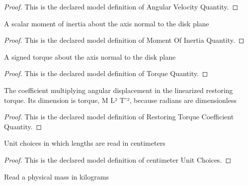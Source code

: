 \begin{proof}
  This is the declared model definition of Angular Velocity Quantity.
\end{proof}
\begin{definition}
  \label{def:physics:phyx-mini-0264:phyxminiproblems-problemphyxmini0264-momentofinertiaquantity}
  A scalar moment of inertia about the axis normal to the disk plane
\end{definition}
\begin{proof}
  This is the declared model definition of Moment Of Inertia Quantity.
\end{proof}
\begin{definition}
  \label{def:physics:phyx-mini-0264:phyxminiproblems-problemphyxmini0264-torquequantity}
  A signed torque about the axis normal to the disk plane
\end{definition}
\begin{proof}
  This is the declared model definition of Torque Quantity.
\end{proof}
\begin{definition}
  \label{def:physics:phyx-mini-0264:phyxminiproblems-problemphyxmini0264-restoringtorquecoefficientquantity}
  The coefficient multiplying angular displacement in the linearized restoring torque. Its dimension is torque, M L² T⁻², because radians are dimensionless
\end{definition}
\begin{proof}
  This is the declared model definition of Restoring Torque Coefficient Quantity.
\end{proof}
\begin{definition}
  \label{def:physics:phyx-mini-0264:phyxminiproblems-problemphyxmini0264-centimeterunitchoices}
  Unit choices in which lengths are read in centimeters
\end{definition}
\begin{proof}
  This is the declared model definition of centimeter Unit Choices.
\end{proof}
\begin{definition}
  \label{def:physics:phyx-mini-0264:phyxminiproblems-problemphyxmini0264-massinkilograms}
  Read a physical mass in kilograms
\end{definition}
